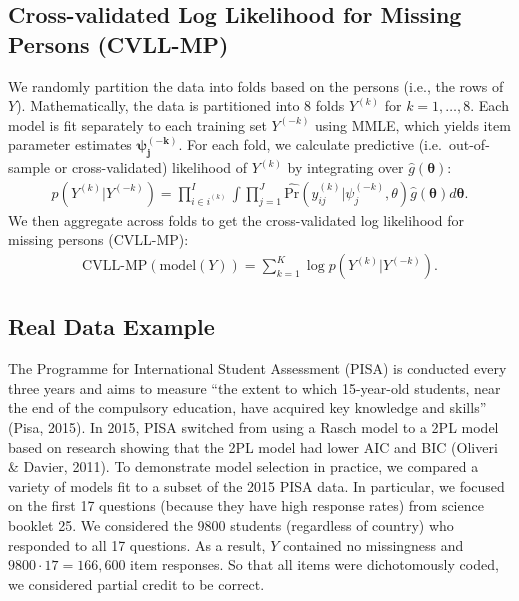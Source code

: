\documentclass[
  english,
  man,floatsintext]{apa7}
\begin{document}
\hypertarget{cross-validated-log-likelihood-for-missing-persons-cvll-mp}{%
\subsection{Cross-validated Log Likelihood for Missing Persons (CVLL-MP)}\label{cross-validated-log-likelihood-for-missing-persons-cvll-mp}}

We randomly partition the data into folds based on the persons (i.e., the rows of \(Y\)). Mathematically, the data is partitioned into 8 folds \(Y^{(k)}\) for \(k = 1, \dots, 8\). Each model is fit separately to each training set \(Y^{(-k)}\) using MMLE, which yields item parameter estimates \(\bm{\psi_j^{(-k)}}\). For each fold, we calculate predictive (i.e.~out-of-sample or cross-validated) likelihood of \(Y^{(k)}\) by integrating over \(\hat g(\bm{\theta})\):
\begin{align}
p(Y^{(k)} | Y^{(-k)}) = \prod_{i \in i^{(k)}}^{I} \int \prod_{j=1}^{J} \hat{\text{Pr}}(y_{ij}^{(k)} | \psi_j^{(-k)}, \theta) \hat g(\bm{\theta})d\bm{\theta}.
\end{align}
We then aggregate across folds to get the cross-validated log likelihood for missing persons (CVLL-MP):
\begin{align}
\text{CVLL-MP}(\text{model}(Y)) = \sum_{k = 1}^{K} \log p(Y^{(k)} | Y^{(-k)}).
\end{align}

\hypertarget{real-data-example}{%
\subsection{Real Data Example}\label{real-data-example}}

The Programme for International Student Assessment (PISA) is conducted every three years and aims to measure ``the extent to which 15-year-old students, near the end of the compulsory education, have acquired key knowledge and skills'' (Pisa, 2015). In 2015, PISA switched from using a Rasch model to a 2PL model based on research showing that the 2PL model had lower AIC and BIC (Oliveri \& Davier, 2011). To demonstrate model selection in practice, we compared a variety of models fit to a subset of the 2015 PISA data. In particular, we focused on the first 17 questions (because they have high response rates) from science booklet 25. We considered the 9800 students (regardless of country) who responded to all 17 questions. As a result, \(Y\) contained no missingness and \(9800 \cdot 17 = 166,600\) item responses. So that all items were dichotomously coded, we considered partial credit to be correct.
\end{document}
